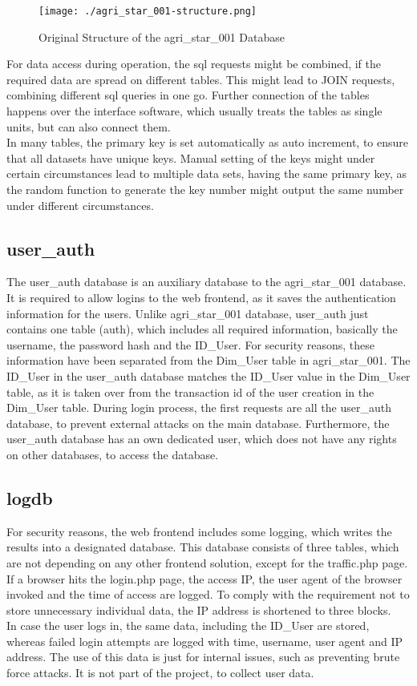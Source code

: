 \begin{figure}[h!]
 \centering
 \texttt{[image: ./agri\_star\_001-structure.png]}
 \caption{Original Structure of the agri\_star\_001 Database}
\end{figure}

\noindent For data access during operation, the sql requests might be combined, if the required data are spread on different tables. This might lead to JOIN requests, combining 
different sql queries in one go. Further connection of the tables happens over the interface software, which usually treats the tables as single units, but can also connect them.\\
In many tables, the primary key is set automatically as auto increment, to ensure that all datasets have unique keys. Manual setting of the keys might under certain circumstances 
lead to multiple data sets, having the same primary key, as the random function to generate the key number might output the same number under different circumstances.

\subsection{user\_auth}

The user\_auth database is an auxiliary database to the agri\_star\_001 database. It is required to allow logins to the web frontend, as it saves the authentication information 
for the users. Unlike agri\_star\_001 database, user\_auth just contains one table (auth), which includes all required information, basically the username, the password hash and the 
ID\_User. For security reasons, these information have been separated from the Dim\_User table in agri\_star\_001. The ID\_User in the user\_auth database matches the ID\_User 
value in the Dim\_User table, as it is taken over from the transaction id of the user creation in the Dim\_User table. During login process, the first requests are all the 
user\_auth database, to prevent external attacks on the main database. Furthermore, the user\_auth database has an own dedicated user, which does not have any rights on other 
databases, to access the database.

\subsection{logdb}
For security reasons, the web frontend includes some logging, which writes the results into a designated database. This database consists of three tables, which are not depending 
on any other frontend solution, except for the traffic.php page. If a browser hits the login.php page, the access IP, the user agent of the browser invoked and the time of access 
are logged. To comply with the requirement not to store unnecessary individual data, the IP address is shortened to three blocks.\\
In case the user logs in, the same data, including the ID\_User are stored, whereas failed login attempts are logged with time, username, user agent and IP address. The use of 
this data is just for internal issues, such as preventing brute force attacks. It is not part of the project, to collect user data.